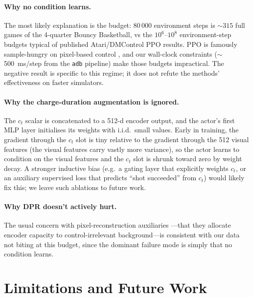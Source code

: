 \documentclass{article}
\begin{document}
\paragraph{Why no condition learns.} The most likely explanation
is the budget: $80\,000$ environment steps is $\sim$$315$ full
games of the 4-quarter Bouncy Basketball, vs the $10^6$--$10^8$
environment-step budgets typical of published Atari/DMControl PPO
results. PPO is famously sample-hungry on pixel-based control
\cite{schulman2017ppo}, and our wall-clock constraints
($\sim$\SI{500}{\milli\second}/step from the \texttt{adb}
pipeline) make those budgets impractical. The negative result is
specific to this regime; it does not refute the methods'
effectiveness on faster simulators.

\paragraph{Why the charge-duration augmentation is ignored.} The
$c_t$ scalar is concatenated to a 512-d encoder output, and the
actor's first MLP layer initialises its weights with i.i.d.\ small
values. Early in training, the gradient through the $c_t$ slot is
tiny relative to the gradient through the 512 visual features (the
visual features carry vastly more variance), so the actor learns to
condition on the visual features and the $c_t$ slot is shrunk
toward zero by weight decay. A stronger inductive bias (e.g.\ a
gating layer that explicitly weights $c_t$, or an auxiliary
supervised loss that predicts ``shot succeeded'' from $c_t$) would
likely fix this; we leave such ablations to future work.

\paragraph{Why DPR doesn't actively hurt.} The usual concern with
pixel-reconstruction auxiliaries \cite{lyle2022what}---that they
allocate encoder capacity to control-irrelevant background---is
consistent with our data not biting at this budget, since the
dominant failure mode is simply that no condition learns.

\section{Limitations and Future Work}
\label{sec:limitations}
\end{document}
